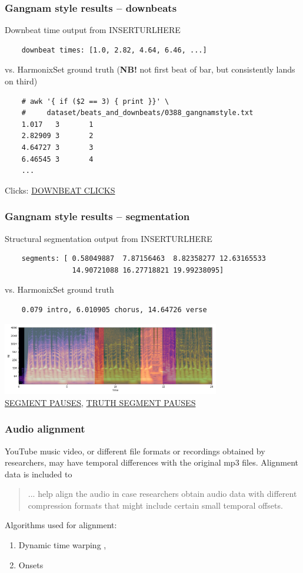 \documentclass{beamer}
\begin{document}
\begin{frame}[fragile]
	\frametitle{Gangnam style results -- downbeats}
	Downbeat time output from INSERTURLHERE
	\begin{verbatim}
	downbeat times: [1.0, 2.82, 4.64, 6.46, ...]
	\end{verbatim}
	vs. HarmonixSet ground truth (\textbf{NB!} not first beat of bar, but consistently lands on third)
	\begin{verbatim}
	# awk '{ if ($2 == 3) { print }}' \
	#     dataset/beats_and_downbeats/0388_gangnamstyle.txt
	1.017   3       1
	2.82909 3       2
	4.64727 3       3
	6.46545 3       4
	...
	\end{verbatim}
	Clicks: \href{run:./gangnam_downbeats.wav}{DOWNBEAT CLICKS}
\end{frame}

\begin{frame}[fragile]
	\frametitle{Gangnam style results -- segmentation}
	Structural segmentation output from INSERTURLHERE
	\begin{verbatim}
	segments: [ 0.58049887  7.87156463  8.82358277 12.63165533
	      	    14.90721088 16.27718821 19.99238095]
	\end{verbatim}
	vs. HarmonixSet ground truth
	\begin{verbatim}
	0.079 intro, 6.010905 chorus, 14.64726 verse
	\end{verbatim}
	\includegraphics[width=9.5cm]{./laplacian_segments.png}\\
	\href{run:./gangnam_segments.wav}{SEGMENT PAUSES}, \href{run:./gangnam_segments_truth.wav}{TRUTH SEGMENT PAUSES}
\end{frame}

\begin{frame}
	\frametitle{Audio alignment}
	YouTube music video, or different file formats or recordings obtained by researchers, may have temporal differences with the original mp3 files. Alignment data is included to
	\begin{quote}
	... help align the audio in case researchers obtain audio data with different compression formats that might include certain small temporal offsets.
	\end{quote}
	Algorithms used for alignment:
	\begin{enumerate}
		\item
			Dynamic time warping , 
		\item
			Onsets 
	\end{enumerate}
\end{frame}
\end{document}
